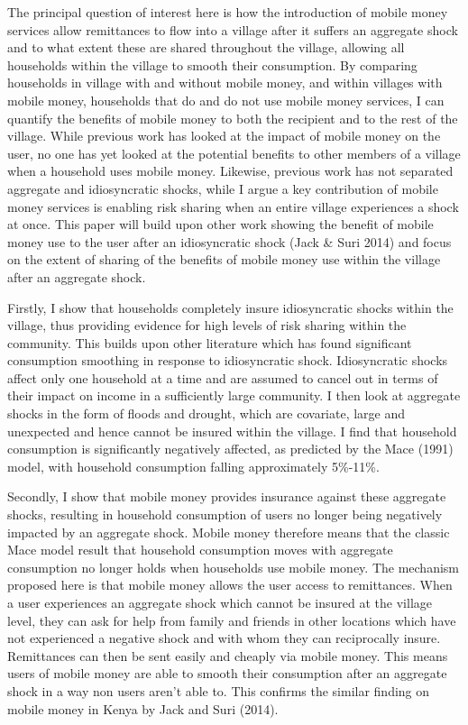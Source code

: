 The principal question of interest here is how the introduction of mobile money services allow remittances to flow into a village after it suffers an aggregate shock and to what extent these are shared throughout the village, allowing all households within the village to smooth their consumption. By comparing households in village with and without mobile money, and within villages with mobile money, households that do and do not use mobile money services, I can quantify the benefits of mobile money to both the recipient and to the rest of the village. While previous work has looked at the impact of mobile money on the user, no one has yet looked at the potential benefits to other members of a village when a household uses mobile money. Likewise, previous work has not separated aggregate and idiosyncratic shocks, while I argue a key contribution of mobile money services is enabling risk sharing when an entire village experiences a shock at once. This paper will build upon other work showing the benefit of mobile money use to the user after an idiosyncratic shock (Jack \& Suri 2014) and focus on the extent of sharing of the benefits of mobile money use within the village after an aggregate shock. 
 
Firstly, I show that households completely insure idiosyncratic shocks within the village, thus providing evidence for high levels of  risk sharing within the community. This builds upon other literature which has found significant consumption smoothing in response to idiosyncratic shock. Idiosyncratic shocks affect only one household at a time and are assumed to cancel out in terms of their impact on income in a sufficiently large community. I then look at aggregate shocks in the form of floods and drought, which are covariate, large and unexpected and hence cannot be insured within the village. I find that household consumption is significantly negatively affected, as predicted by the Mace (1991) model, with household consumption falling approximately 5\%-11\%.  

Secondly, I show that mobile money provides insurance against these aggregate shocks, resulting in household consumption of users no longer being negatively impacted by an aggregate shock. Mobile money therefore means that the classic Mace model result that household consumption moves with aggregate consumption no longer holds when households use mobile money. The mechanism proposed here is that mobile money allows the user access to remittances. When a user experiences an aggregate shock which cannot be insured at the village level, they can ask for help from family and friends in other locations which have not experienced a negative shock and with whom they can reciprocally insure. Remittances can then be sent easily and cheaply via mobile money. This means users of mobile money are able to smooth their consumption after an aggregate shock in a way non users aren't able to. This confirms the similar finding on mobile money in Kenya by Jack and Suri (2014).   


